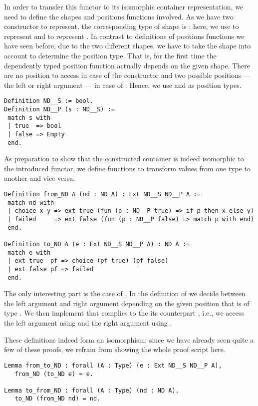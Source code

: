 In order to transfer this functor to its isomorphic container
representation, we need to define the shapes and positions functions
involved.
As we have two constructor to represent, the corresponding type of
shape is ; here, we use  to represent
 and  to represent .
In contrast to definitions of positions functions we have seen before,
due to the two different shapes, we have to take the shape into
account to determine the position type.
That is, for the first time the dependently typed position function
actually depends on the given shape.
There are no position to access in case of the 
constructor and two possible positions --- the left or right argument
--- in case of .
Hence, we use  and  as position types.

\begin{verbatim}
Definition ND__S := bool.
Definition ND__P (s : ND__S) :=
 match s with
 | true  => bool
 | false => Empty
 end.
\end{verbatim}

As preparation to show that the constructed container is indeed
isomorphic to the introduced functor, we define functions to transform
values from one type to another and vice versa.

\begin{verbatim}
Definition from_ND A (nd : ND A) : Ext ND__S ND__P A :=
 match nd with
 | choice x y => ext true (fun (p : ND__P true) => if p then x else y)
 | failed     => ext false (fun (p : ND__P false) => match p with end)
 end.

Definition to_ND A (e : Ext ND__S ND__P A) : ND A :=
 match e with
 | ext true  pf => choice (pf true) (pf false)
 | ext false pf => failed
 end.
\end{verbatim}

The only interesting part is the case of .
In the definition of  we decide between the left
argument  and right argument  depending on the given
position  that is of type .
We then implement  that complies to the its counterpart
, i.e., we access the left argument using 
and the right argument using .

These definitions indeed form an isomorphism; since we have already
seen quite a few of these proofs, we refrain from showing the whole
proof script here.

\begin{verbatim}
Lemma from_to_ND : forall (A : Type) (e : Ext ND__S ND__P A),
   from_ND (to_ND e) = e.

Lemma to_from_ND : forall (A : Type) (nd : ND A),
   to_ND (from_ND nd) = nd.
\end{verbatim}

